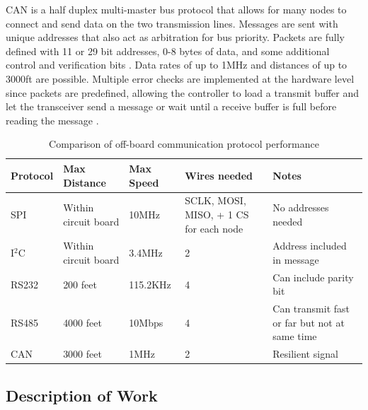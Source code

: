 \newline
CAN is a half duplex multi-master bus protocol that allows for many nodes to connect and send data on the two transmission lines. Messages are sent with unique addresses that also act as arbitration for bus priority. Packets are fully defined with 11 or 29 bit addresses, 0-8 bytes of data, and some additional control and verification bits \cite{CAN_Guide,CAN_Requirements}. Data rates of up to 1MHz and distances of up to 3000ft are possible. Multiple error checks are implemented at the hardware level since packets are predefined, allowing the controller to load a transmit buffer and let the transceiver send a message or wait until a receive buffer is full before reading the message \cite{CANvSPI}. 

\begin{table}[H]
	\begin{center}
		\begin{tabular} {| l | l | p{2cm} | p{2.5cm} | p{2.5cm} |}
			\hline
			Protocol & Max Distance & Max Speed & Wires needed & Notes \\ \hline
			SPI & Within circuit board & 10MHz & SCLK, MOSI, MISO, + 1 CS for each node & No addresses needed
			\\ \hline
			I$^2$C & Within circuit board & 3.4MHz & 2 & Address included in message
			\\ \hline
			RS232 & 200 feet & 115.2KHz & 4 & Can include parity bit
			\\ \hline
			RS485 & 4000 feet & 10Mbps & 4 & Can transmit fast or far but not at same time
			\\ \hline
			CAN & 3000 feet & 1MHz & 2 & Resilient signal
			\\ \hline
		\end{tabular}
	\end{center}
	\caption{Comparison of off-board communication protocol performance}
	\label{tbl:Comm_CompareP}
\end{table}


\subsection{Description of Work}

